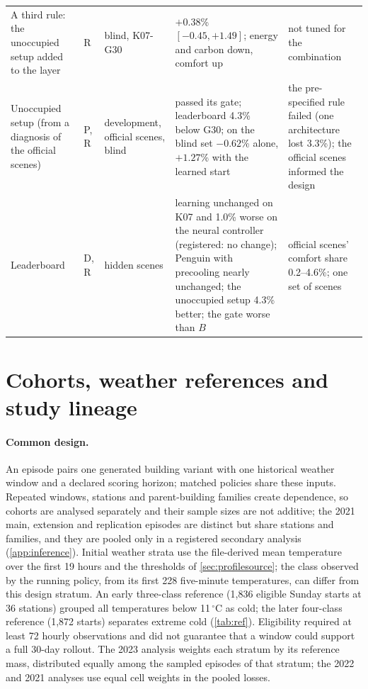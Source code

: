 {\begin{longtable}{>{\raggedright\arraybackslash}p{3.0cm}>{\raggedright\arraybackslash}p{0.75cm}>{\raggedright\arraybackslash}p{1.9cm}>{\raggedright\arraybackslash}p{3.4cm}>{\raggedright\arraybackslash}p{3.5cm}}
A third rule: the unoccupied setup added to the layer & R & blind, K07-G30 & $+0.38$\% $[-0.45, +1.49]$; energy and carbon down, comfort up & not tuned for the combination\\
Unoccupied setup (from a diagnosis of the official scenes) & P, R & development, official scenes, blind & passed its gate; leaderboard 4.3\% below G30; on the blind set $-0.62$\% alone, $+1.27$\% with the learned start & the pre-specified rule failed (one architecture lost 3.3\%); the official scenes informed the design\\
Leaderboard & D, R & hidden scenes & learning unchanged on K07 and 1.0\% worse on the neural controller (registered: no change); Penguin with precooling nearly unchanged; the unoccupied setup 4.3\% better; the gate worse than $B$ & official scenes' comfort share 0.2--4.6\%; one set of scenes\\
\end{longtable}}

\section{Cohorts, weather references and study lineage}\label{app:cohorts}
\paragraph{Common design.}
An episode pairs one generated building variant with one historical weather window and a declared scoring horizon; matched
policies share these inputs. Repeated windows, stations and parent-building families create dependence, so cohorts are
analysed separately and their sample sizes are not additive; the 2021 main, extension and replication episodes are distinct
but share stations and families, and they are pooled only in a registered secondary analysis (\cref{app:inference}). Initial weather strata use the file-derived mean temperature
over the first 19 hours and the thresholds of \cref{sec:profilesource}; the class observed by the running policy, from its
first 228 five-minute temperatures, can differ from this design stratum. An early three-class reference (1,836 eligible
Sunday starts at 36 stations) grouped all temperatures below 11\,$^\circ$C as cold; the later four-class reference (1,872
starts) separates extreme cold (\cref{tab:ref}). Eligibility required at least 72 hourly observations and did not guarantee
that a window could support a full 30-day rollout. The 2023 analysis weights each stratum by its reference mass, distributed
equally among the sampled episodes of that stratum; the 2022 and 2021 analyses use equal cell weights in the pooled losses.

